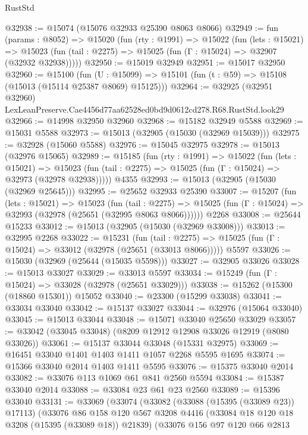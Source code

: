 \begin{lexlean}{RustStd}
\begin{coremodule}
@32938 := @15074 (@15076 @32933 @25390 @8063 @8066)
@32949 := fun (params : @8052) =>
  @15020
    (fun (rty : @1991) =>
    @15022
      (fun (lets : @15021) =>
      @15023 (fun (tail : @2275) => @15025 (fun (Γ : @15024) => @32907 (@32932 @32938)))))
@32950 := @15019 @32949
@32951 := @15017 @32950
@32960 := @15100
    (fun (U : @15099) => @15101 (fun (t : @59) => @15108 (@15013 (@15114 @25387 @8069) @15125)))
@32964 := @32925
    (@32951 @32960)
    LexLeanPreserve.Cae4456d77aa62528ed0bd9d0612cd278.R68.RustStd.look29
@32966 := @14998 @32950 @32960
@32968 := @15182 @32949 @5588
@32969 := @15031 @5588
@32973 := @15013 (@32905 (@15030 (@32969 @15039)))
@32975 := @32928 (@15060 @5588)
@32976 := @15045 @32975
@32978 := @15013 (@32976 @15065)
@32989 := @15185
    (fun (rty : @1991) =>
    @15022
      (fun (lets : @15021) =>
      @15023 (fun (tail : @2275) => @15025 (fun (Γ : @15024) => @32973 (@32978 @32938)))))
    @4355
@32993 := @15013 (@32905 (@15030 (@32969 @25645)))
@32995 := @25652 @32933 @25390
@33007 := @15207
    (fun (lets : @15021) =>
    @15023
      (fun (tail : @2275) =>
      @15025 (fun (Γ : @15024) => @32993 (@32978 (@25651 (@32995 @8063 @8066))))))
    @2268
@33008 := @25644 @15233
@33012 := @15013 (@32905 (@15030 (@32969 @33008)))
@33013 := @32995 @2268
@33022 := @15231
    (fun (tail : @2275) => @15025 (fun (Γ : @15024) => @33012 (@32978 (@25651 (@33013 @8066)))))
    @5597
@33026 := @15030 (@32969 (@25644 (@15035 @5598)))
@33027 := @32905 @33026
@33028 := @15013 @33027
@33029 := @33013 @5597
@33034 := @15249 (fun (Γ : @15024) => @33028 (@32978 (@25651 @33029)))
@33038 := @15262 (@15300 (@18860 @15301)) @15052
@33040 := @23300 (@15299 @33038)
@33041 := @33034 @33040
@33042 := @15137 @33027
@33044 := @32976 (@15064 @33040)
@33045 := @15013 @33044
@33048 := @15071 @33040 @25650 @33029
@33057 := @33042 (@33045 @33048) (@8209 @12912 @12908 @33026 @12919 (@8080 @33026))
@33061 := @15137 @33044 @33048 (@15331 @32975)
@33069 := @16451 @33040 @1401 @1403 @1411 @1057 @2268 @5595 @1695
@33074 := @15366 @33040 @2014 @1403 @1411 @5595
@33076 := @15375 @33040 @2014
@33082 := @33076 @113 @1069 @61 @841 @2560 @5594
@33084 := @15387 @33040 @2014
@33088 := @33084 @23 @61 @23 @2560
@33089 := @15396 @33040
@33131 := @33069
    (@33074
      (@33082
        (@33088 (@15395 (@33089 @23)) @17113)
        (@33076
          @86
          @158
          @120
          @567
          @3208
          @4416
          (@33084 @18 @120 @18 @3208 (@15395 (@33089 @18)) @21839)
          (@33076
            @156
            @97
            @120
            @66
            @2813

\end{coremodule}
\end{lexlean}
